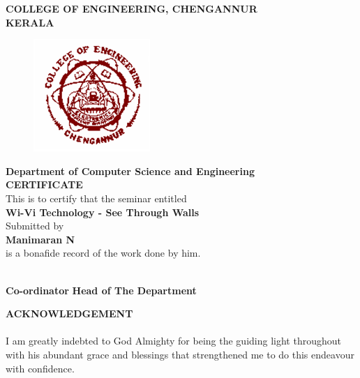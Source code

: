 \documentclass[a4paper,12pt,oneside]{article}
\begin{document}
\newpage
\thispagestyle{empty}
\begin{center}
\setlength{\baselineskip}{1.5\baselineskip}
{\large\textbf{COLLEGE OF ENGINEERING, CHENGANNUR}}
\\
{\large\textbf{KERALA}}
\\
\begin{figure}[H]
\centering
\includegraphics{ceclogo.png}
\end{figure}
\setlength{\baselineskip}{1.5\baselineskip}
\textbf{Department of Computer Science and Engineering}
\\
\textbf{CERTIFICATE}
\\
This is to certify that the seminar entitled
\\
\textbf{Wi-Vi Technology - See Through Walls}
\\
Submitted by
\\
\textbf{Manimaran N}
\\
is a bonafide record of the work done by him.
\end{center}
\vspace{8mm}
\vspace{14ex}
\hspace{55ex}
\\
\vspace{2ex}
\hspace{0ex}
\textbf{
Co-ordinator}
\hspace{45ex}
\textbf{
Head of The Department}
\newpage
{}


\renewcommand{\headrulewidth}{0.0pt}
\renewcommand{\footrulewidth}{0.0pt}



\begin{center}
\large{\textbf{ACKNOWLEDGEMENT}}
\end{center}
\vspace{6ex}
\setlength{\baselineskip}{1.5\baselineskip}

\paragraph{}
I am greatly indebted to God Almighty for being the guiding light throughout with his
abundant grace and blessings that strengthened me to do this endeavour with confidence.
\end{document}
